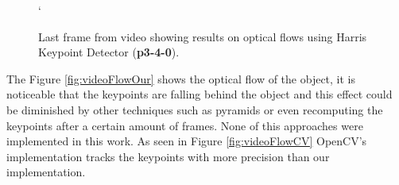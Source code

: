 \documentclass[12pt,a4paper]{article}
\begin{document}
\begin{figure}[!h]
	\centering
	`
	\enskip
	\caption{Last frame from video showing results on optical flows using Harris Keypoint Detector (\textbf{p3-4-0}).}
	\label{fig:flowVideo}
\end{figure}

The Figure \ref{fig:videoFlowOur} shows the optical flow of the object, it is noticeable that the keypoints are falling behind the object and this effect could be diminished by other techniques such as pyramids or even recomputing the keypoints after a certain amount of frames. None of this approaches were implemented in this work. As seen in Figure \ref{fig:videoFlowCV} OpenCV's implementation tracks the keypoints with more precision than our implementation.  \\
\end{document}
